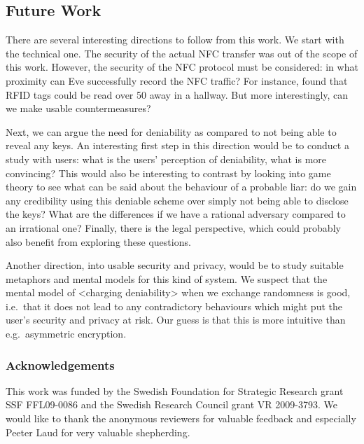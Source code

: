\subsection{Future Work}

There are several interesting directions to follow from this work.
We start with the technical one.
The security of the actual \ac{NFC} transfer was out of the scope of this work.
However, the security of the \ac{NFC} protocol must be considered: in what 
proximity can Eve successfully record the \ac{NFC} traffic?
For instance, \citet{RFIDProximity} found that RFID tags could be read over 
\unit{50}{\metre} away in a hallway.
But more interestingly, can we make usable countermeasures?

Next, we can argue the need for deniability as compared to not being able to 
reveal any keys.
An interesting first step in this direction would be to conduct a study with 
users: what is the users' perception of deniability, what is more convincing?
This would also be interesting to contrast by looking into game theory to see 
what can be said about the behaviour of a probable liar: do we gain any 
credibility using this deniable scheme over simply not being able to disclose 
the keys?
What are the differences if we have a rational adversary compared to an 
irrational one?
Finally, there is the legal perspective, which could probably also benefit from 
exploring these questions.

Another direction, into usable security and privacy, would be to study suitable 
metaphors and mental models for this kind of system.
We suspect that the mental model of <charging deniability> when we exchange 
randomness is good, i.e.~that it does not lead to any contradictory behaviours 
which might put the user's security and privacy at risk.
Our guess is that this is more intuitive than e.g.~asymmetric encryption.


\subsubsection*{Acknowledgements}

This work was funded by the Swedish Foundation for Strategic Research grant SSF 
FFL09-0086 and the Swedish Research Council grant VR 2009-3793.
We would like to thank the anonymous reviewers for valuable feedback and 
especially Peeter Laud for very valuable shepherding.


\printbibliography{}

